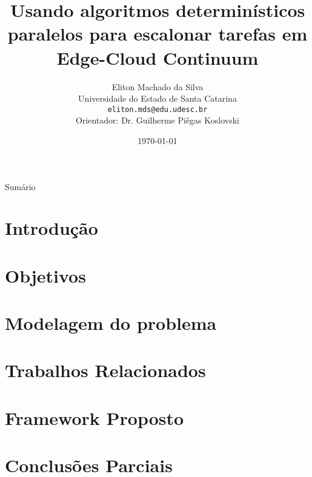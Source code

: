 \documentclass[xcolor=table]{beamer}
\title[]{Usando algoritmos determinísticos paralelos para escalonar tarefas em Edge-Cloud Continuum}
\author[Eliton Machado da Silva]{
    Eliton Machado da Silva\\\smallskip
    {\scriptsize Universidade do Estado de Santa Catarina \\\smallskip
    \vspace{-2mm}
    \texttt{eliton.mds@edu.udesc.br}\\\medskip
    {Orientador: Dr. Guilherme Piêgas Koslovski}\\
    }
}
\date{\today}
\begin{document}
    \begin{frame}
        \titlepage
    \end{frame}

    \begin{frame}[allowframebreaks]{Sumário}
        \tableofcontents
    \end{frame}

    \section[]{Introdução}
    
    

    \section[]{Objetivos}
    

    \section[]{Modelagem do problema}
    

    \section[]{Trabalhos Relacionados}

    \section[]{Framework Proposto}
    

    \section[]{Conclusões Parciais}
    
    

\end{document}
